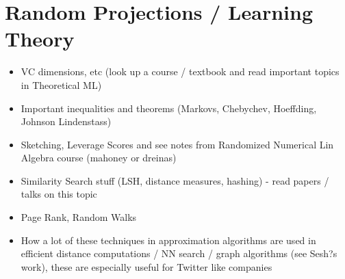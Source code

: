 \documentclass[english, 11pt]{article}
\begin{document}
\section{Random Projections / Learning Theory}
\begin{itemize}
\item VC dimensions, etc (look up a course / textbook and read important topics in Theoretical ML)
\item Important inequalities and theorems (Markovs, Chebychev, Hoeffding, Johnson Lindenstass)
\item Sketching, Leverage Scores and see notes from Randomized Numerical Lin Algebra course (mahoney or dreinas)
\item Similarity Search stuff (LSH, distance measures, hashing) - read papers / talks on this topic
\item Page Rank, Random Walks
\item How a lot of these techniques in approximation algorithms are used in efficient distance computations / NN search / graph algorithms (see Sesh?s work), these are especially useful for Twitter like companies
\end{itemize}
	
\end{document}
